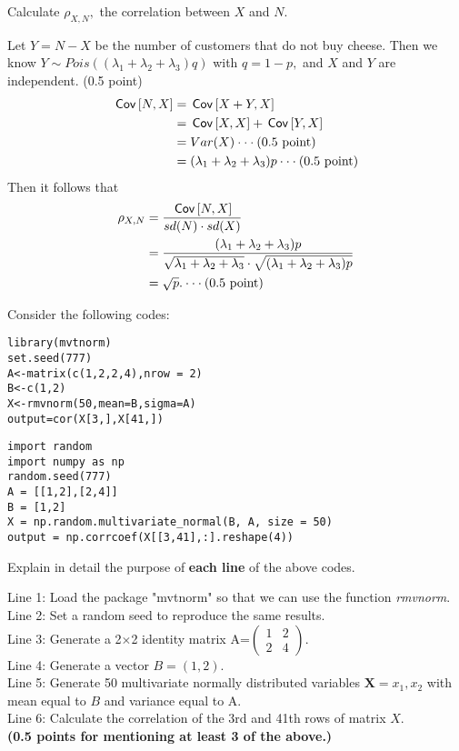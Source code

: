 \begin{exercise}[2]
Calculate $\rho_{X,N},$ the correlation between $X$ and $N$.
\begin{solution}
 Let $Y=N-X$ be the number of customers that do not buy cheese. Then we know $Y\sim Pois((\lambda_1+\lambda_2+\lambda_3) q)$ with $q=1-p,$ and $X$ and $Y$ are independent. (0.5 point)
 \begin{align*}
     \,\mathsf{Cov}\left[N,X\right]&=\,\mathsf{Cov}\left[X+Y,X\right]\\
     &=\,\mathsf{Cov}\left[X,X\right]+\,\mathsf{Cov}\left[Y,X\right]\\
     &=Var(X)\cdot \cdot \cdot\text{(0.5 point)}\\
     &=(\lambda_1+\lambda_2+\lambda_3)p \cdot \cdot \cdot \text{(0.5 point)}
 \end{align*}
 Then it follows that
 \begin{align*}
     \rho_{X,N}&=\frac{\,\mathsf{Cov}\left[N,X\right]}{sd(N)\cdot sd(X)}\\
     &=\frac{(\lambda_1+\lambda_2+\lambda_3)p}{\sqrt{\lambda_1+\lambda_2+\lambda_3}\cdot \sqrt{(\lambda_1+\lambda_2+\lambda_3)p} }\\
     &=\sqrt{p}.\cdot \cdot \cdot\text{(0.5 point)}
 \end{align*}
\end{solution}
\end{exercise}

\noindent Consider the following codes:
\begin{verbatim}
library(mvtnorm)
set.seed(777)
A<-matrix(c(1,2,2,4),nrow = 2)
B<-c(1,2)
X<-rmvnorm(50,mean=B,sigma=A)
output=cor(X[3,],X[41,])
\end{verbatim}


\begin{verbatim}
import random
import numpy as np
random.seed(777)
A = [[1,2],[2,4]]
B = [1,2]
X = np.random.multivariate_normal(B, A, size = 50)
output = np.corrcoef(X[[3,41],:].reshape(4))
\end{verbatim}

\begin{exercise}[1]
Explain in detail the purpose of \textbf{each line} of the above codes.
\begin{solution}
Line 1: Load the package "mvtnorm" so that we can use the function \textit{rmvnorm}.\\
Line 2: Set a random seed to reproduce the same results.\\
Line 3: Generate a 2$\times$2 identity matrix A=$\begin{pmatrix}1&2\\2&4\end{pmatrix}$.\\
Line 4: Generate a vector $B=(1,2)$.\\
Line 5: Generate 50 multivariate normally distributed variables $\textbf{X}={x_1,x_2}$ with mean equal to $B$ and variance equal to A.\\
Line 6: Calculate the correlation of the 3rd and 41th rows of matrix $X$.\\
\textbf{(0.5 points for mentioning at least 3 of the above.)}
\end{solution}
\end{exercise}
